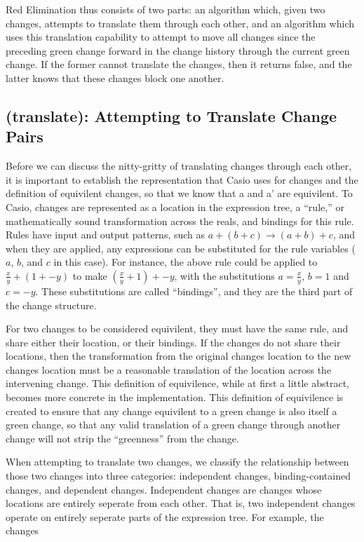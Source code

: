 \documentclass{article}
\begin{document}
Red Elimination thus consists of two parts: 
an algorithm which, given two changes, 
attempts to translate them through each other, 
and an algorithm which uses this translation capability 
to attempt to move all changes since the preceding green change 
forward in the change history 
through the current green change. 
If the former cannot translate the changes, 
then it returns false, 
and the latter knows that these changes block one another.

\subsection{(translate): Attempting to Translate Change Pairs}

Before we can discuss the nitty-gritty of translating changes through each other, 
it is important to establish the representation that Casio uses for changes 
and the definition of equivilent changes, 
so that we know that a and a' are equivilent. 
To Casio, changes are represented as a location in the expression tree, 
a ``rule,'' or mathematically sound transformation across the reals, 
and bindings for this rule. 
Rules have input and output patterns, 
such as $a + (b + c) \to (a + b) + c$,
and when they are applied, 
any expressions can be substituted for the rule variables 
($a$, $b$, and $c$ in this case). 
For instance, 
the above rule could be applied 
to $\frac{x}{y} + (1 + -y)$ 
to make $(\frac{x}{y} + 1) + -y$, 
with the substitutions $a = \frac{x}{y}$, $b = 1$ and $c = -y$. 
These substitutions are called ``bindings'', 
and they are the third part of the change structure.

For two changes to be considered equivilent, 
they must have the same rule, 
and share either their location, 
or their bindings. 
If the changes do not share their locations, 
then the transformation from the original changes location 
to the new changes location must be a reasonable translation 
of the location across the intervening change. 
This definition of equivilence, 
while at first a little abstract, 
becomes more concrete in the implementation. 
This definition of equivilence is created to ensure 
that any change equivilent to a green change 
is also itself a green change, 
so that any valid translation of a green change 
through another change 
will not strip the ``greenness'' from the change.

When attempting to translate two changes, 
we classify the relationship between those two changes 
into three categories: 
independent changes, 
binding-contained changes, 
and dependent changes. 
Independent changes are changes whose locations 
are entirely seperate from each other. 
That is, 
two independent changes operate 
on entirely seperate parts 
of the expression tree. 
For example, 
the changes 
\end{document}
